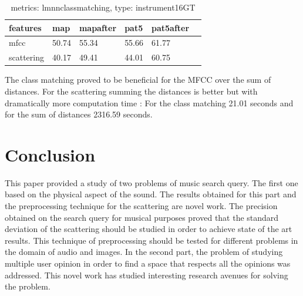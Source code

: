 \documentclass[hidelinks,12pt]{report}
\begin{document}
\begin{enumerate}
\begin{table}[H]
\begin{center}
\begin{tabular}{ | l | l | l | l | l | l |}
features & map & mapafter & pat5 & pat5after\\ 
\hline 
mfcc & 50.74 & 55.34 & 55.66 & 61.77 \\ 
scattering & 40.17 & 49.41 & 44.01 & 60.75  \\  
\end{tabular} 
\end{center} 
\caption{metrics: lmnnclassmatching, type: instrument16GT} 
\label{you} 
\end{table}  
The class matching proved to be beneficial for the MFCC over the sum of distances. For the scattering summing the distances is better but with dramatically more computation time : For the class matching 21.01 seconds and for the sum of distances 2316.59 seconds.  
\end{enumerate}

\section{Conclusion}
This paper provided a study of two problems of music search query. The first one based on the physical aspect of the sound. The results obtained for this part and the preprocessing technique for the scattering are novel work. The precision obtained on the search query for musical purposes proved that the standard deviation of the scattering should be studied in order to achieve state of the art results. This technique of preprocessing should be tested for different problems in the domain of audio and images.
In the second part, the problem of studying multiple user opinion in order to find a space that respects all the opinions was addressed. This novel work has studied interesting research avenues for solving the problem.
\end{document}
